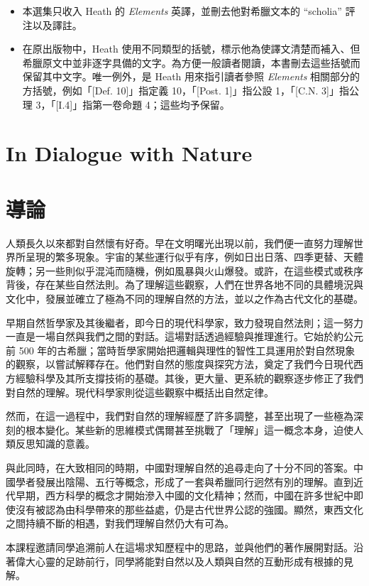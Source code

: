 \documentclass[UTF8,zihao=-4]{ctexart}
\begin{document}
\begin{itemize}
\item 本選集只收入 Heath 的 \textit{Elements} 英譯，並刪去他對希臘文本的 ``scholia'' 評注以及譯註。
\item 在原出版物中，Heath 使用不同類型的括號，標示他為使譯文清楚而補入、但希臘原文中並非逐字具備的文字。為方便一般讀者閱讀，本書刪去這些括號而保留其中文字。唯一例外，是 Heath 用來指引讀者參照 \textit{Elements} 相關部分的方括號，例如「[Def. 10]」指定義 10，「[Post. 1]」指公設 1，「[C.N. 3]」指公理 3，「[I.4]」指第一卷命題 4；這些均予保留。
\end{itemize}

\section*{In Dialogue with Nature}
\section*{導論}
\noindent 人類長久以來都對自然懷有好奇。早在文明曙光出現以前，我們便一直努力理解世界所呈現的繁多現象。宇宙的某些運行似乎有序，例如日出日落、四季更替、天體旋轉；另一些則似乎混沌而隨機，例如風暴與火山爆發。或許，在這些模式或秩序背後，存在某些自然法則。為了理解這些觀察，人們在世界各地不同的具體境況與文化中，發展並確立了極為不同的理解自然的方法，並以之作為古代文化的基礎。

\noindent 早期自然哲學家及其後繼者，即今日的現代科學家，致力發現自然法則；這一努力一直是一場自然與我們之間的對話。這場對話透過經驗與推理進行。它始於約公元前 500 年的古希臘；當時哲學家開始把邏輯與理性的智性工具運用於對自然現象的觀察，以嘗試解釋存在。他們對自然的態度與探究方法，奠定了我們今日現代西方經驗科學及其所支撐技術的基礎。其後，更大量、更系統的觀察逐步修正了我們對自然的理解。現代科學家則從這些觀察中概括出自然定律。

\noindent 然而，在這一過程中，我們對自然的理解經歷了許多調整，甚至出現了一些極為深刻的根本變化。某些新的思維模式偶爾甚至挑戰了「理解」這一概念本身，迫使人類反思知識的意義。

\noindent 與此同時，在大致相同的時期，中國對理解自然的追尋走向了十分不同的答案。中國學者發展出陰陽、五行等概念，形成了一套與希臘同行迥然有別的理解。直到近代早期，西方科學的概念才開始滲入中國的文化精神；然而，中國在許多世紀中即使沒有被認為由科學帶來的那些益處，仍是古代世界公認的強國。顯然，東西文化之間持續不斷的相遇，對我們理解自然仍大有可為。

\noindent 本課程邀請同學追溯前人在這場求知歷程中的思路，並與他們的著作展開對話。沿著偉大心靈的足跡前行，同學將能對自然以及人類與自然的互動形成有根據的見解。
\end{document}
